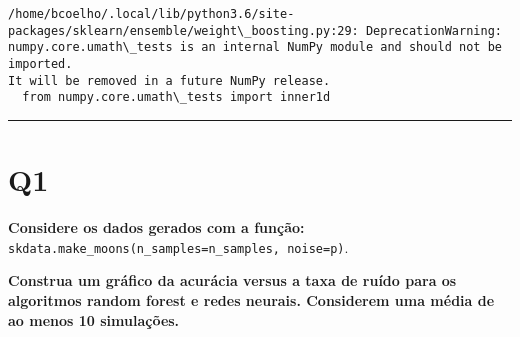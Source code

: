 \documentclass[11pt]{article}
\begin{document}
    \begin{Verbatim}[commandchars=\\\{\}]
/home/bcoelho/.local/lib/python3.6/site-
packages/sklearn/ensemble/weight\_boosting.py:29: DeprecationWarning:
numpy.core.umath\_tests is an internal NumPy module and should not be imported.
It will be removed in a future NumPy release.
  from numpy.core.umath\_tests import inner1d
\end{Verbatim}

    \begin{center}\rule{0.5\linewidth}{\linethickness}\end{center}

 

    \hypertarget{q1}{%
\section{Q1}\label{q1}}

\textbf{Considere os dados gerados com a função:}
\texttt{skdata.make\_moons(n\_samples=n\_samples,\ noise=p)}.

\textbf{Construa um gráfico da acurácia versus a taxa de ruído para os
algoritmos random forest e redes neurais. Considerem uma média de ao
menos 10 simulações.}
\end{document}
